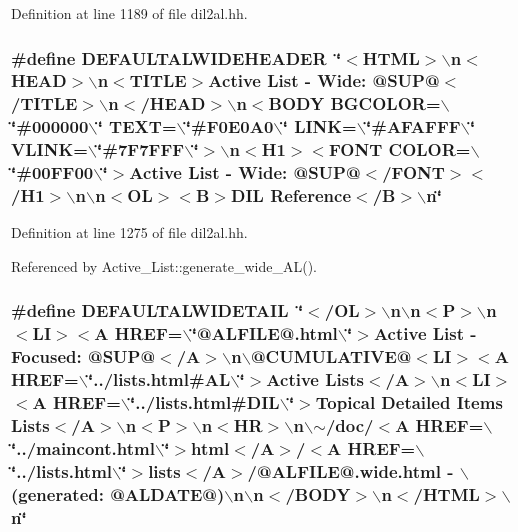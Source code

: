 Definition at line 1189 of file dil2al.hh.
\subsubsection{\setlength{\rightskip}{0pt plus 5cm}\#define DEFAULTALWIDEHEADER\ \char`\"{}$<$HTML$>$$\backslash$n$<$HEAD$>$$\backslash$n$<$TITLE$>$Active List - Wide: @SUP@$<$/TITLE$>$$\backslash$n$<$/HEAD$>$$\backslash$n$<$BODY BGCOLOR=$\backslash$\char`\"{}\#000000$\backslash$\char`\"{} TEXT=$\backslash$\char`\"{}\#F0E0A0$\backslash$\char`\"{} LINK=$\backslash$\char`\"{}\#AFAFFF$\backslash$\char`\"{} VLINK=$\backslash$\char`\"{}\#7F7FFF$\backslash$\char`\"{}$>$$\backslash$n$<$H1$>$$<$FONT COLOR=$\backslash$\char`\"{}\#00FF00$\backslash$\char`\"{}$>$Active List - Wide: @SUP@$<$/FONT$>$$<$/H1$>$$\backslash$n$\backslash$n$<$OL$>$$<$B$>$DIL Reference$<$/B$>$$\backslash$n\char`\"{}}\label{dil2al_8hh_a102}




Definition at line 1275 of file dil2al.hh.

Referenced by Active\_\-List::generate\_\-wide\_\-AL().
\subsubsection{\setlength{\rightskip}{0pt plus 5cm}\#define DEFAULTALWIDETAIL\ \char`\"{}$<$/OL$>$$\backslash$n$\backslash$n$<$P$>$$\backslash$n$<$LI$>$$<$A HREF=$\backslash$\char`\"{}@ALFILE@.html$\backslash$\char`\"{}$>$Active List - Focused: @SUP@$<$/A$>$$\backslash$n$\backslash$@CUMULATIVE@$<$LI$>$$<$A HREF=$\backslash$\char`\"{}../lists.html\#AL$\backslash$\char`\"{}$>$Active Lists$<$/A$>$$\backslash$n$<$LI$>$$<$A HREF=$\backslash$\char`\"{}../lists.html\#DIL$\backslash$\char`\"{}$>$Topical Detailed Items Lists$<$/A$>$$\backslash$n$<$P$>$$\backslash$n$<$HR$>$$\backslash$n$\backslash$$\sim$/doc/$<$A HREF=$\backslash$\char`\"{}../maincont.html$\backslash$\char`\"{}$>$html$<$/A$>$/$<$A HREF=$\backslash$\char`\"{}../lists.html$\backslash$\char`\"{}$>$lists$<$/A$>$/@ALFILE@.wide.html - $\backslash$(generated: @ALDATE@)$\backslash$n$\backslash$n$<$/BODY$>$$\backslash$n$<$/HTML$>$$\backslash$n\char`\"{}}\label{dil2al_8hh_a103}




